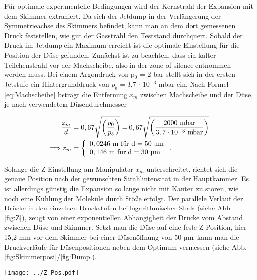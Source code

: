 Für optimale experimentelle Bedingungen wird der Kernstrahl der Expansion mit dem Skimmer extrahiert. Da sich der Jetdump in der Verlängerung der Symmetrieachse des Skimmers befindet, kann man an dem dort gemessenen Druck feststellen, wie gut der Gasstrahl den Teststand durchquert.
Sobald der Druck im Jetdump ein Maximum erreicht ist die optimale Einstellung für die Position der Düse gefunden. Zunächst ist zu beachten, dass ein kalter Teilchenstrahl vor der Machscheibe, also in der zone of silence entnommen werden muss.
Bei einem Argondruck von \linebreak p$_0$ = 2 bar stellt sich in der ersten Jetstufe ein Hintergrunddruck von \linebreak $p_b$ = 3,7 $\cdot$ 10$^{-3}$ mbar ein. Nach Formel \ref{eq:Machscheibe} beträgt die Entfernung $x_m$ zwischen Machscheibe und der Düse, je nach verwendetem Düsendurchmesser

\begin{equation}
   \begin{split}
   \frac{x_m}{d} & =0,67 \sqrt{\left(\frac{p_0}{p_b}\right)} = 0,67 \sqrt{\left(\frac{2000 \ \textmd{mbar}}{3,7 \cdot 10^{-3}\ \textmd{mbar}}\right)}\\ 
   \Longrightarrow x_m  & =  
   \left\{ %
   \begin{array}{l}
   0,0246\ \textmd{m} \textmd{ für d}= 50 \textmd{ µm} \\ 
   0,146\ \textmd{m} \textmd{ für d}= 30 \textmd{ µm}
   \end{array}
   \right. .
   \end{split}
\end{equation}


Solange die Z-Einstellung am Manipulator $x_m$ unterschreitet, richtet sich die genaue Position nach der gewünschten Strahlintensität in der Hauptkammer. Es ist allerdings günstig die Expansion so lange nicht mit Kanten zu stören, wie noch eine Kühlung der Moleküle durch Stöße erfolgt. Der parallele Verlauf der Drücke in den einzelnen Druckstufen bei logarithmischer Skala (siehe Abb. \ref{fig:Z}), zeugt von einer exponentiellen Abhängigheit der Drücke vom Abstand zwischen Düse und Skimmer. Setzt man die Düse auf eine feste Z-Position, hier 15,2 mm vor dem Skimmer bei einer Düsenöffnung von 50 µm, kann man die Druckverläufe für Düsenpositionen neben dem Optimum vermessen (siehe Abb. \ref{fig:Skimmerposi}/\ref{fig:Dump}).
\begin{center}
	\begin{minipage}{\linewidth}
		\centering
		\texttt{[image: ../Z-Pos.pdf]}%
		\label{fig:Z}
	\end{minipage} 
\end{center} 


